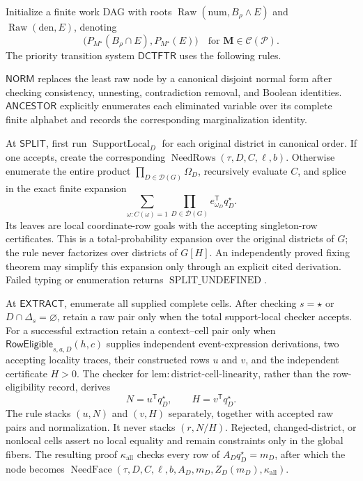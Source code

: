 Initialize a finite work DAG with roots \(\operatorname{Raw}(\mathrm{num},B_\rho\wedge E)\) and \(\operatorname{Raw}(\mathrm{den},E)\), denoting
\[
\bigl(P_{M^\star}(B_\rho\cap E),P_{M^\star}(E)\bigr)
\quad\text{for }\mathbf M\in\mathcal C(\mathcal P).
\]
The priority transition system \(\mathsf{DCTFTR}\) uses the following rules.

\(\mathsf{NORM}\) replaces the least raw node by a canonical disjoint normal form after checking consistency, unnesting, contradiction removal, and Boolean identities.  \(\mathsf{ANCESTOR}\) explicitly enumerates each eliminated variable over its complete finite alphabet and records the corresponding marginalization identity.

At \(\mathsf{SPLIT}\), first run \(\operatorname{SupportLocal}_D\) for each original district in canonical order.  If one accepts, create the corresponding \(\operatorname{NeedRows}(\tau,D,C,\ell,b)\).  Otherwise enumerate the entire product \(\prod_{D\in\mathcal D(G)}\Omega_D\), recursively evaluate \(C\), and splice in the exact finite expansion
\[
\sum_{\omega:C(\omega)=1}
\prod_{D\in\mathcal D(G)}e_{\omega_D}^{\mathsf T}q_D^\star.
\]
Its leaves are local coordinate-row goals with the accepting singleton-row certificates.  This is a total-probability expansion over the original districts of \(G\); the rule never factorizes over districts of \(G[H]\).  An independently proved fixing theorem may simplify this expansion only through an explicit cited derivation.  Failed typing or enumeration returns \(\operatorname{SPLIT\_UNDEFINED}\).

At \(\mathsf{EXTRACT}\), enumerate all supplied complete cells.  After checking \(s=\star\) or \(D\cap\Delta_s=\varnothing\), retain a raw pair only when the total support-local checker accepts.  For a successful extraction retain a context--cell pair only when \(\mathsf{RowEligible}_{s,a,D}(h,c)\) supplies independent event-expression derivations, two accepting locality traces, their constructed rows \(u\) and \(v\), and the independent certificate \(H>0\).  The checker for \(\mathrm{lem:district\text{-}cell\text{-}linearity}\), rather than the row-eligibility record, derives
\[
N=u^{\mathsf T}q_D^\star,
\qquad H=v^{\mathsf T}q_D^\star.
\]
The rule stacks \((u,N)\) and \((v,H)\) separately, together with accepted raw pairs and normalization.  It never stacks \((r,N/H)\).  Rejected, changed-district, or nonlocal cells assert no local equality and remain constraints only in the global fibers.  The resulting proof \(\kappa_{\mathrm{all}}\) checks every row of \(A_Dq_D^\star=m_D\), after which the node becomes \(\operatorname{NeedFace}(\tau,D,C,\ell,b,A_D,m_D,Z_D(m_D),\kappa_{\mathrm{all}})\).

